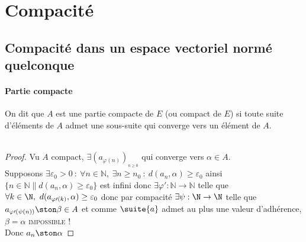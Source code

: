 	\section{Compacité}
	\subsection{Compacité dans un espace vectoriel normé quelconque}
		\traitd
		\paragraph{Partie compacte}
			On dit que $A$ est une partie compacte de $E$ (ou compact de $E$) si toute suite d'éléments de $A$ 
			admet une sous-suite qui converge vers un élément de $A$. \trait
		\vspace*{0.5cm} \\ 
		\vspace*{0.5cm} \\ 
		\begin{proof}
		\fbox{$\Leftarrow$} Vu $A$ compact, $\exists \left( a_{\varphi (n)} \right) _{_{n\geq 0}}$ qui converge vers $\alpha \in A$.\\
		Supposons $\exists \varepsilon_0 >0 ~:~ \forall n\in\mathbb{N} , ~\exists n\geq n_0 ~:~d(a_n,\alpha )\geq \varepsilon_0$ ainsi 
		$\{n\in\mathbb{N} \| d(a_n,\alpha )\geq\varepsilon_0\}$ est infini donc $\exists \varphi\prime : \mathbb{N} \rightarrow \mathbb{N}$ 
		telle que $\forall k\in\N ,~d(a_{\varphi\prime (k)} ,\alpha )\geq\varepsilon_0 $ donc par compacité $\exists \psi : \N \rightarrow\N$ 
		telle que $a_{\varphi\prime (\psi (n))} \ston \beta \in A$ et comme $\suite{a}$ admet au plus une valeur d'adhérence, $\beta = \alpha$ 
		\textsc{impossible !} \\Donc $a_n \ston \alpha$
		\end{proof}
		${}$ \\  \newpage \traitd
